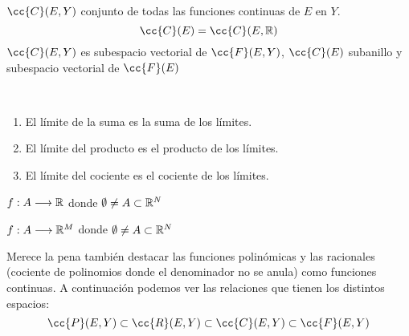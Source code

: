 \begin{definicion}
    $\cc{C}(E,Y)$ conjunto de todas las funciones continuas de $E$ en $Y$. 
    $$\cc{C}(E) = \cc{C}(E,\R)$$
    $\cc{C}(E,Y)$ es subespacio vectorial de $\cc{F}(E,Y)$, $\cc{C}(E)$ subanillo y subespacio vectorial de $\cc{F}(E)$
\end{definicion}

\begin{prop} \\
    \begin{enumerate}
        \item El límite de la suma es la suma de los límites.
        \item El límite del producto es el producto de los límites.
        \item El límite del cociente es el cociente de los límites.
    \end{enumerate}
\end{prop}

\begin{definicion}
    $f:A\longrightarrow \mathbb R$ donde $\emptyset \neq A \subset \mathbb R^N$
\end{definicion}

\begin{definicion}
    $f:A\longrightarrow \mathbb R^M$ donde $\emptyset \neq A \subset \mathbb R^N$
\end{definicion}



Merece la pena también destacar las funciones polinómicas y las racionales (cociente de polinomios donde el denominador no se anula) como funciones continuas. \newline
A continuación podemos ver las relaciones que tienen los distintos espacios:
$$\cc{P}(E,Y) \subset \cc{R}(E,Y) \subset \cc{C}(E,Y) \subset \cc{F}(E,Y)$$